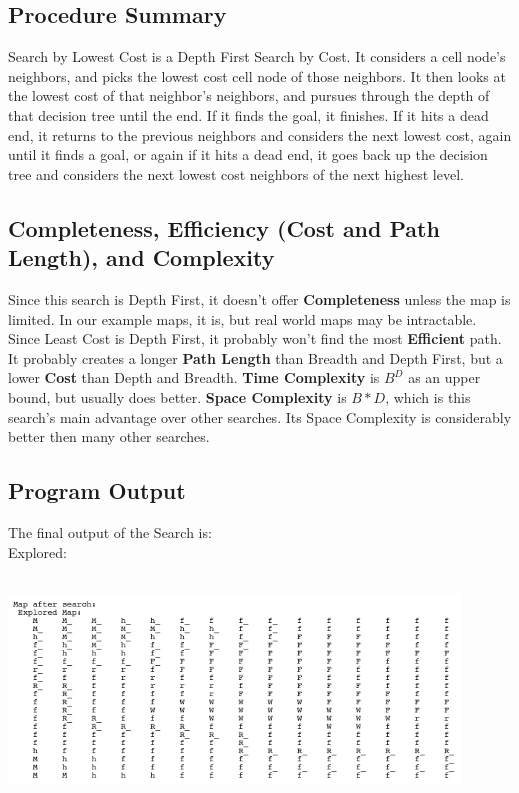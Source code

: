 \documentclass[12pt]{article}
\begin{document}
	\subsection{Procedure Summary}
	Search by Lowest Cost is a Depth First Search by Cost. It considers a cell node's neighbors, and picks the lowest cost cell node of those neighbors. It then looks at the lowest cost of that neighbor's neighbors, and pursues through the depth of that decision tree until the end. If it finds the goal, it finishes. If it hits a dead end, it returns to the previous neighbors and considers the next lowest cost, again until it finds a goal, or again if it hits a dead end, it goes back up the decision tree and considers the next lowest cost neighbors of the next highest level.

	\subsection{Completeness, Efficiency (Cost and Path Length), and Complexity}
	Since this search is Depth First, it doesn't offer \textbf{Completeness} unless the map is limited. In our example maps, it is, but real world maps may be intractable. Since Least Cost is Depth First, it probably won't find the most \textbf{Efficient} path. It probably creates a longer \textbf{Path Length} than Breadth and Depth First, but a lower \textbf{Cost} than Depth and Breadth. \textbf{Time Complexity}  is $B^D$ as an upper bound, but usually does better. \textbf{Space Complexity} is $B * D$, which is this search's main advantage over other searches. Its Space Complexity is considerably better then many other searches.

	\subsection{Program Output}
	The final output of the Search is:
	\\
	Explored:
	\begin{center}
		\includegraphics[width=120mm,height=60mm]{images/cost/final_map_explored.png}
	\end{center}
\end{document}
